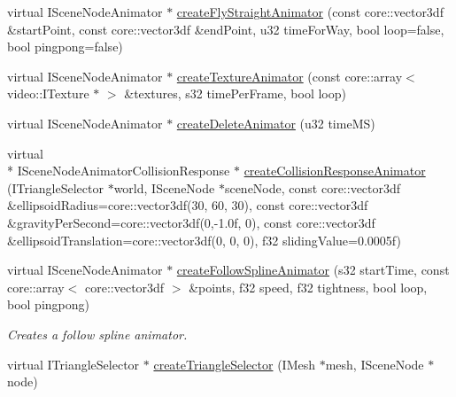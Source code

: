 \begin{DoxyCompactItemize}
virtual I\-Scene\-Node\-Animator $\ast$ \hyperlink{classirr_1_1scene_1_1_c_scene_manager_a244c8ef1830bec752f357ece18ee4173}{create\-Fly\-Straight\-Animator} (const core\-::vector3df \&start\-Point, const core\-::vector3df \&end\-Point, u32 time\-For\-Way, bool loop=false, bool pingpong=false)
\item 
virtual I\-Scene\-Node\-Animator $\ast$ \hyperlink{classirr_1_1scene_1_1_c_scene_manager_a14319a725b000a5c19b3e07e19eb2898}{create\-Texture\-Animator} (const core\-::array$<$ video\-::\-I\-Texture $\ast$ $>$ \&textures, s32 time\-Per\-Frame, bool loop)
\item 
virtual I\-Scene\-Node\-Animator $\ast$ \hyperlink{classirr_1_1scene_1_1_c_scene_manager_abb106b4a6f0a9ff8d73be64972ffd5ba}{create\-Delete\-Animator} (u32 time\-M\-S)
\item 
virtual \\*
I\-Scene\-Node\-Animator\-Collision\-Response $\ast$ \hyperlink{classirr_1_1scene_1_1_c_scene_manager_ae21d47b1d04e0a364799ecdfeacb1d2b}{create\-Collision\-Response\-Animator} (I\-Triangle\-Selector $\ast$world, I\-Scene\-Node $\ast$scene\-Node, const core\-::vector3df \&ellipsoid\-Radius=core\-::vector3df(30, 60, 30), const core\-::vector3df \&gravity\-Per\-Second=core\-::vector3df(0,-\/1.\-0f, 0), const core\-::vector3df \&ellipsoid\-Translation=core\-::vector3df(0, 0, 0), f32 sliding\-Value=0.\-0005f)
\item 
\hypertarget{classirr_1_1scene_1_1_c_scene_manager_ae4b181a88d51de97025eec4274a9c8d2}{virtual I\-Scene\-Node\-Animator $\ast$ \hyperlink{classirr_1_1scene_1_1_c_scene_manager_ae4b181a88d51de97025eec4274a9c8d2}{create\-Follow\-Spline\-Animator} (s32 start\-Time, const core\-::array$<$ core\-::vector3df $>$ \&points, f32 speed, f32 tightness, bool loop, bool pingpong)}\label{classirr_1_1scene_1_1_c_scene_manager_ae4b181a88d51de97025eec4274a9c8d2}

\begin{DoxyCompactList}\small\item\em Creates a follow spline animator. \end{DoxyCompactList}\item 
\hypertarget{classirr_1_1scene_1_1_c_scene_manager_a1d80cdc75776b924584d7f41af4a3f1c}{virtual I\-Triangle\-Selector $\ast$ \hyperlink{classirr_1_1scene_1_1_c_scene_manager_a1d80cdc75776b924584d7f41af4a3f1c}{create\-Triangle\-Selector} (I\-Mesh $\ast$mesh, I\-Scene\-Node $\ast$node)}\label{classirr_1_1scene_1_1_c_scene_manager_a1d80cdc75776b924584d7f41af4a3f1c}


\end{DoxyCompactItemize}
